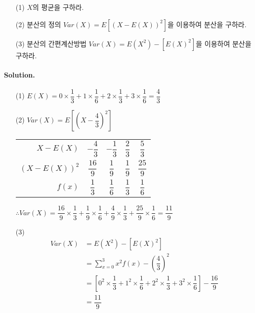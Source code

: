 \begin{itemize}
  \item [(1)] $X$의 평균을 구하라.
  \item [(2)] 분산의 정의 $Var\left(X\right) = E\left[\left(X - E\left(X\right)\right)^2\right]$을 이용하여 분산을 구하라.
  \item [(3)] 분산의 간편계산방법 $Var\left(X\right) = E\left(X^2\right) - \left[E\left(X\right)^2\right]$을 이용하여 분산을 구하라.
\end{itemize}

\paragraph{Solution.} 
\begin{itemize}
  \item [(1)] $E\left(X\right) = 0\times \dfrac{1}{3} + 1\times \dfrac{1}{6} + 2 \times \dfrac{1}{3} + 3\times \dfrac{1}{6} = \dfrac{4}{3}$
  \item [(2)] $Var\left(X\right) = E\left[\left(X - \dfrac{4}{3}\right)^2\right]$
\begin{center}
	\begin{tabular}{r|cccc}
		 $X-E\left(X\right)$ & $-\dfrac{4}{3}$ & $-\dfrac{1}{3}$ & $\dfrac{2}{3}$ & $\dfrac{5}{3}$ \\
		 $\left(X-E\left(X\right)\right)^2$ & $\dfrac{16}{9}$ & $\dfrac{1}{9}$ & $\dfrac{1}{9}$ & $\dfrac{25}{9}$ \\
		 \hline
		 $f\left(x\right)$ & $\dfrac{1}{3}$ & $\dfrac{1}{6}$ & $\dfrac{1}{3}$ & $\dfrac{1}{6}$ \\
	\end{tabular}
\end{center}
$\therefore Var\left(X\right) = \dfrac{16}{9}\times \dfrac{1}{3} + \dfrac{1}{9} \times \dfrac{1}{6} + \dfrac{4}{9} \times \dfrac{1}{3} + \dfrac{25}{9}\times \dfrac{1}{6} = \dfrac{11}{9}$\\
  \item [(3)] \begin{align*}
  	Var\left(X\right) &= E\left(X^2\right) - \left[E\left(X\right)^2\right]\\
  	&= \sum_{x=0}^{3} x^2 f\left(x\right) - \left(\dfrac{4}{3}\right)^2\\
  	&= \left[0^2\times \dfrac{1}{3} + 1^2\times \dfrac{1}{6} + 2^2\times \dfrac{1}{3} + 3^2\times \dfrac{1}{6}\right] - \dfrac{16}{9}\\
  	&= \dfrac{11}{9}
  \end{align*}
\end{itemize}

